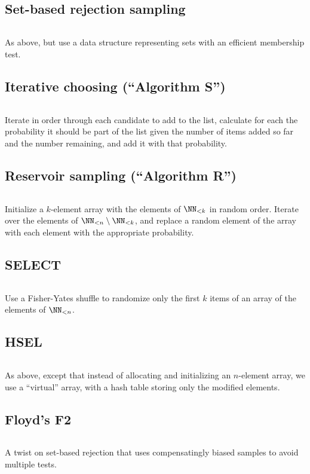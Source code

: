 \documentclass[letterpaper,luatex,11pt]{article}
\begin{document}
\subsection{Set-based rejection sampling}
\inputminted{Python}{code/rejectionsample.py}
As above, but use a data structure representing sets with an efficient membership test.
\cite{goodman}

\subsection{Iterative choosing (``Algorithm S'')}
\inputminted{Python}{code/iterativechoose.py}
Iterate in order through each candidate to add to the list,
calculate for each the probability it should be part of the list given
the number of items added so far and the number remaining, and add
it with that probability.
\cite{taocp2}
\cite[Method 1, p.391]{fanetal}

\subsection{Reservoir sampling (``Algorithm R'')}
\inputminted{Python}{code/reservoirsample.py}
Initialize a \(k\)-element array with the elements of \(\NN_{<k}\)
in random order. Iterate over the elements of \(\NN_{<n} \setminus \NN_{<k}\),
and replace a random element of the array with each element with the
appropriate probability.
\cite{taocp2}

\subsection{SELECT}
\inputminted{Python}{code/select.py}
Use a Fisher-Yates shuffle to randomize only the first \(k\) items of
an array of the elements of \(\NN_{<n}\). \cite{goodman}

\subsection{HSEL}
\inputminted{Python}{code/hsel.py}
As above, except that instead of allocating and initializing an
\(n\)-element array, we use a ``virtual'' array, with a hash table
storing only the modified elements.
\cite{hsel}

\subsection{Floyd's F2}
\inputminted{Python}{code/floydf2.py}
A twist on set-based rejection that uses compensatingly biased samples
to avoid multiple tests.
\cite{floydf2}
\end{document}
